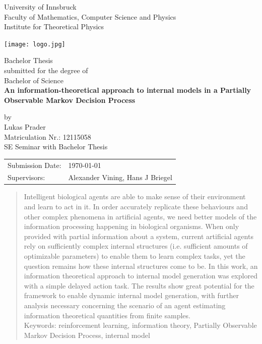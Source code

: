 \documentclass[12pt,a4paper]{article}
\begin{document}
\def\findate{\today}


\thispagestyle{empty}
\begin{center}
    \Large{University of Innsbruck \\ Faculty of Mathematics, Computer Science and Physics} \\
    \vspace{3mm}
    \large{Institute for Theoretical Physics}
    \vspace{10mm}

    \texttt{[image: logo.jpg]}

    \vspace{10mm}
    \Large{Bachelor Thesis} \\
    \large{submitted for the degree of} \\
    \Large{Bachelor of Science} \\
    \vspace{10mm}
    \LARGE{\textbf{An information-theoretical approach to internal models in a Partially Observable Markov Decision Process}} \\
    \vspace{10mm}

    \large{by \\ Lukas Prader \\ Matriculation Nr.: 12115058 \\ SE Seminar with Bachelor Thesis}
\end{center}

\vspace{30mm}
\begin{tabular}{ll}
    \large{Submission Date:} & \large{\findate}                          \\
    \large{Supervisors:}     & \large{Alexander Vining, Hans J  Briegel} \\
\end{tabular}


\newpage
\thispagestyle{empty}
\begin{abstract}
    \noindent Intelligent biological agents are able to make sense of their environment and learn to act in it.
    In order accurately replicate these behaviours and other complex phenomena in artificial agents, we need better models of the information processing happening in biological organisms.
    When only provided with partial information about a system, current artificial agents rely on sufficiently complex internal structures (i.e. sufficient amounts of optimizable parameters) to enable them to learn complex tasks, yet the question remains how these internal structures come to be.
    In this work, an information theoretical approach to internal model generation was explored with a simple delayed action task.
    The results show great potential for the framework to enable dynamic internal model generation, with further analysis necessary concerning the scenario of an agent estimating information theoretical quantities from finite samples.\\

    \noindent Keywords: reinforcement learning, information theory, Partially Observable Markov Decision Process, internal model
\end{abstract}
\end{document}
